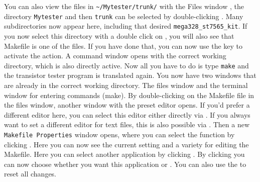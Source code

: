 You can also view the files in \verb"~/Mytester/trunk/" with the Files window , the directory \verb"Mytester" and then
\verb"trunk" can be selected by double-clicking \LMB.
Many subdirectories now appear here, including that desired \verb"mega328_st7565_kit".
If you now select this directory with a double click on \LMB,
you will also see that Makefile is one of the files.
If you have done that, you can now use the \RMB key to activate the  action.
A command window opens with the correct working directory, which is also directly active.
Now all you have to do is type \verb"make" and 
the transistor tester program is translated again.
You now have two windows that are already in the correct working directory.
The files window and the terminal window for entering commands (make).
By double-clicking \LMB on the Makefile file in the files window,
another window with the preset editor opens.
If you'd prefer a different editor here, you can select this editor either
directly via \RMB {}.
If you always want to set a different editor for text files,
this is also possible via \RMB {}.
Then a new \verb"Makefile Properties" window opens, where you can select the
function  by clicking \RMB.
Here you can now see the current setting and a variety for editing the Makefile.
Here you can select another application by clicking \LMB.
By clicking \LMB you can now choose whether you want this
application  or .
You can also use the  to reset all changes. 

